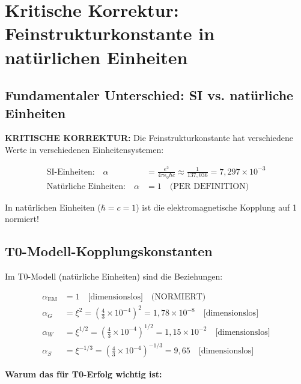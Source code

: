 \documentclass[12pt,a4paper]{report}
\begin{document}
	\section{Kritische Korrektur: Feinstrukturkonstante in natürlichen Einheiten}
	\label{sec:fine_structure_correction}
	
	\subsection{Fundamentaler Unterschied: SI vs. natürliche Einheiten}
	\label{subsec:si_vs_natural_units}
	
	\textbf{KRITISCHE KORREKTUR:} Die Feinstrukturkonstante hat verschiedene Werte in verschiedenen Einheitensystemen:
	
	\begin{tcolorbox}[colback=red!10!white,colframe=red!75!black,title=KRITISCHER PUNKT]
		\begin{align}
			\text{SI-Einheiten:} \quad \alpha &= \frac{e^2}{4\pi\epsilon_0\hbar c} \approx \frac{1}{137,036} = 7,297 \times 10^{-3} \\
			\text{Natürliche Einheiten:} \quad \alpha &= 1 \quad \text{(PER DEFINITION)}
		\end{align}
		
		In natürlichen Einheiten ($\hbar = c = 1$) ist die elektromagnetische Kopplung auf 1 normiert!
	\end{tcolorbox}
	
	\subsection{T0-Modell-Kopplungskonstanten}
	\label{subsec:t0_coupling_corrected}
	
	Im T0-Modell (natürliche Einheiten) sind die Beziehungen:
	
	\begin{align}
		\alpha_{\text{EM}} &= 1 \quad \text{[dimensionslos]} \quad \text{(NORMIERT)} \\
		\alpha_G &= \xi^2 = \left(\frac{4}{3} \times 10^{-4}\right)^2 = 1,78 \times 10^{-8} \quad \text{[dimensionslos]} \\
		\alpha_W &= \xi^{1/2} = \left(\frac{4}{3} \times 10^{-4}\right)^{1/2} = 1,15 \times 10^{-2} \quad \text{[dimensionslos]} \\
		\alpha_S &= \xi^{-1/3} = \left(\frac{4}{3} \times 10^{-4}\right)^{-1/3} = 9,65 \quad \text{[dimensionslos]}
	\end{align}
	
	\textbf{Warum das für T0-Erfolg wichtig ist:}
	
\end{document}
